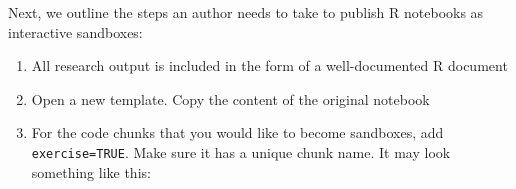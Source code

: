 \DIFaddbegin \begin{Schunk}
\begin{figure}

{\centering {}

}

\caption[A comparison of minimal examples of a typical .Rmd document and a .Rmd document for an interactive sandbox app]{}\label{fig:fig_skeleton}
\end{figure}
\end{Schunk}

\DIFaddend Next, we outline the steps an author needs to take to publish R
notebooks as interactive sandboxes:

\begin{enumerate}
\def\labelenumi{\arabic{enumi}.}
\tightlist
\item
  All research output is included in the form of a well-documented R
  \DIFdelbegin {}\DIFdelend \DIFaddbegin {}\DIFaddend document
\item
  Open a new \DIFdelbegin \emph{} %
\DIFdelend \DIFaddbegin {} \DIFaddend template. Copy the content of
  the original notebook
\item
  For the code chunks that you would like to become sandboxes, add
  \texttt{exercise=TRUE}. Make sure it has a unique chunk name. It may
  look something like this:
\end{enumerate}

